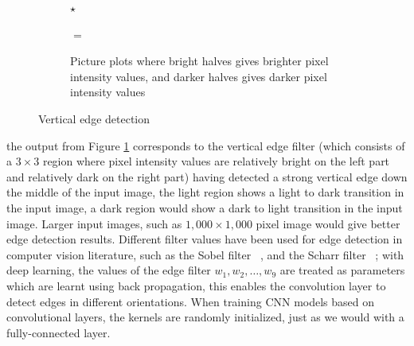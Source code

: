 \documentclass[12pt]{report}
\numberwithin{equation}{section}
\begin{document}
\begin{figure}[H]
	\begin{subfigure}[t]{.7\linewidth}
	\centering
	\hspace{0.4mm}
	$\star$
	\hspace{0.4mm}
	\hspace{0.4mm}
	$=$
	\hspace{0.4mm}
	\caption{Picture plots where bright halves gives brighter pixel intensity values, and darker halves gives darker pixel intensity values}	 
	\label{subfig:detection1}
	\end{subfigure}
\caption{Vertical edge detection}	 
\label{fig:detection}
\end{figure} 
\noindent
the output from Figure \ref{subfig:detection1} corresponds to the vertical edge filter (which consists of a $3 \times 3$ region where pixel intensity values are relatively bright on the left part and relatively dark on the right part) having detected a strong vertical edge down the middle of the input image, the light region shows a light to dark transition in the input image, a dark region would show a dark to light transition in the input image. Larger input images, such as $1,000 \times 1,000$ pixel image would give better edge detection results. Different filter values have been used for edge detection in computer vision literature, such as the Sobel filter ~\textbf{\cite{sobel19683x3}}, and the Scharr filter ~\textbf{\cite{jaehne1999k}}; with deep learning, the values of the edge filter $w_1,w_2,\hdots,w_9$ are treated as parameters which are learnt using back propagation, this enables the convolution layer to detect edges in different orientations. When training CNN models based on convolutional layers, the kernels are randomly initialized, just as we would with a fully-connected layer.  
\end{document}
